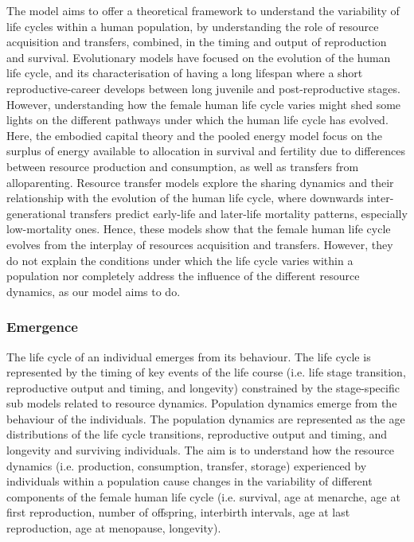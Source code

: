 \documentclass{article}
\begin{document}
The model aims to offer a theoretical framework to understand the variability of life cycles within a human population, by understanding the role of resource acquisition and transfers, combined, in the timing and output of reproduction and survival. Evolutionary models have focused on the evolution of the human life cycle, and its characterisation of having a long lifespan where a short reproductive-career develops between long juvenile and post-reproductive stages. However, understanding how the female human life cycle varies might shed some lights on the different pathways under which the human life cycle has evolved. Here, the embodied capital theory \citep{kaplan2000theory} and the pooled energy model \citep{kramer2010pooled} focus on the surplus of energy available to allocation in survival and fertility due to differences between resource production and consumption, as well as transfers from alloparenting. Resource transfer models \citep{lee2003rethinking,chu2006co} explore the sharing dynamics and their relationship with the evolution of the human life cycle, where downwards inter-generational transfers predict early-life and later-life mortality patterns, especially low-mortality ones. Hence, these models show that the female human life cycle evolves from the interplay of resources acquisition and transfers. However, they do not explain the conditions under which the life cycle varies within a population nor completely address the influence of the different resource dynamics, as our model aims to do.

\subsubsection{Emergence}

The life cycle of an individual emerges from its behaviour. The life cycle is represented by the timing of key events of the life course (i.e. life stage transition, reproductive output and timing, and longevity) constrained by the stage-specific sub models related to resource dynamics. Population dynamics emerge from the behaviour of the individuals. The population dynamics are represented as the age distributions of the life cycle transitions, reproductive output and timing, and longevity and surviving individuals. The aim is to understand how the resource dynamics (i.e. production, consumption, transfer, storage) experienced by individuals within a population cause changes in the variability of different components of the female human life cycle (i.e. survival, age at menarche, age at first reproduction, number of offspring, interbirth intervals, age at last reproduction, age at menopause, longevity).
\end{document}

